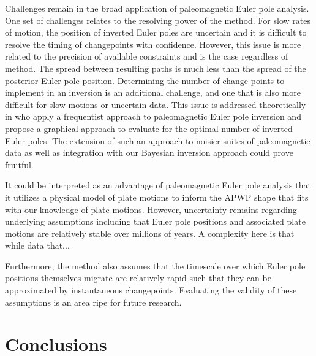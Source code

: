 \documentclass[11pt,letterpaper]{article}
\begin{document}
Challenges remain in the broad application of paleomagnetic Euler pole analysis. One set of challenges relates to the resolving power of the method. For slow rates of motion, the position of inverted Euler poles are uncertain and it is difficult to resolve the timing of changepoints with confidence. However, this issue is more related to the precision of available constraints and is the case regardless of method. The spread between resulting paths is much less than the spread of the posterior Euler pole position. Determining the number of change points to implement in an inversion is an additional challenge, and one that is also more difficult for slow motions or uncertain data. This issue is addressed theoretically in \cite{Gallo2021a} who apply a frequentist approach to paleomagnetic Euler pole inversion and propose a graphical approach to evaluate for the optimal number of inverted Euler poles. The extension of such an approach to noisier suites of paleomagnetic data as well as integration with our Bayesian inversion approach could prove fruitful. 

It could be interpreted as an advantage of paleomagnetic Euler pole analysis that it utilizes a physical model of plate motions to inform the APWP shape that fits with our knowledge of plate motions. However, uncertainty remains regarding underlying assumptions including that Euler pole positions and associated plate motions are relatively stable over millions of years. A complexity here is that while data that...





Furthermore, the method also assumes that the timescale over which Euler pole positions themselves migrate are relatively rapid such that they can be approximated by instantaneous changepoints. Evaluating the validity of these assumptions is an area ripe for future research. 

\section*{Conclusions}
\label{sec:conclusions}
\end{document}
